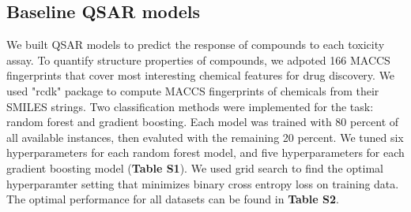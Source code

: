 \documentclass{article}
\begin{document}
\subsection{Baseline QSAR models}
We built QSAR models to predict the response of compounds to each toxicity assay.
To quantify structure properties of compounds, we adpoted 166 MACCS fingerprints that cover most interesting chemical features for drug discovery. 
We used "rcdk" package \cite{guha2007chemical} to compute MACCS fingerprints of chemicals from their SMILES strings.  
Two classification methods were implemented for the task: random forest and gradient boosting. 
Each model was trained with 80 percent of all available instances, then evaluted with the remaining 20 percent.
We tuned six hyperparameters for each random forest model, and five hyperparameters for each gradient boosting model (\textbf{Table S1}). 
We used grid search to find the optimal hyperparamter setting that minimizes binary cross entropy loss on training data.  
The optimal performance for all datasets can be found in \textbf{Table S2}. 




 
\end{document}
